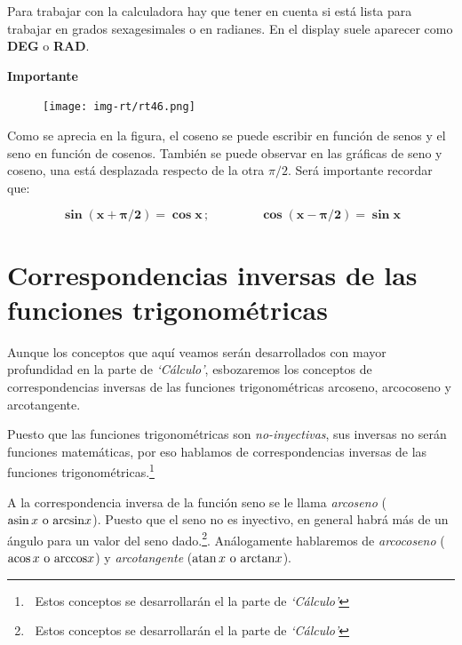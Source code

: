 \vspace{7mm}
Para trabajar con la calculadora hay que tener en cuenta si está lista para trabajar en grados sexagesimales o en radianes. En el display suele aparecer como \textbf{DEG} o \textbf{RAD}.


\vspace{10mm} %

\begin{cuadro-naranja}
\textbf{Importante}
\begin{figure}[H]
	\centering
	\texttt{[image: img-rt/rt46.png]}
\end{figure}
	Como se aprecia en la figura, el coseno se puede escribir en función de senos y el seno en función de cosenos. También se puede observar en las gráficas de seno y coseno, una está desplazada respecto de la otra $\pi/2$. Será importante recordar que:
	
	$$ \boldsymbol{ \sin(x+\pi/2)=\cos x \, ; \qquad  \qquad \cos(x-\pi/2)=\sin x }$$
\end{cuadro-naranja}






\vspace{1cm}
\section{Correspondencias inversas de las funciones trigonométricas}
\vspace{0.5cm}

Aunque los conceptos que aquí veamos serán desarrollados con mayor profundidad en la parte de \emph{`Cálculo'}, esbozaremos los conceptos de correspondencias inversas de las funciones trigonométricas arcoseno, arcocoseno y arcotangente.

\textcolor{gris}{Puesto que las funciones trigonométricas son \emph{no-inyectivas}, sus inversas no serán funciones matemáticas, por eso hablamos de correspondencias inversas de las funciones trigonométricas.}\footnote{ $\ $ Estos conceptos se desarrollarán el la parte de \emph{`Cálculo'}}

A la correspondencia inversa de la función seno se le llama \emph{arcoseno} ($\asin x \text{ o } \mathrm{arcsin} x$). Puesto que el seno no es inyectivo, en general habrá más de un ángulo para un valor del seno dado.\footnote{ $\ $ Estos conceptos se desarrollarán el la parte de \emph{`Cálculo'}}. Análogamente hablaremos de \emph{arcocoseno} ($\acos x \text{ o } \mathrm{arccos} x$) y \emph{arcotangente} ($\atan x \text{ o } \mathrm{arctan} x$).


